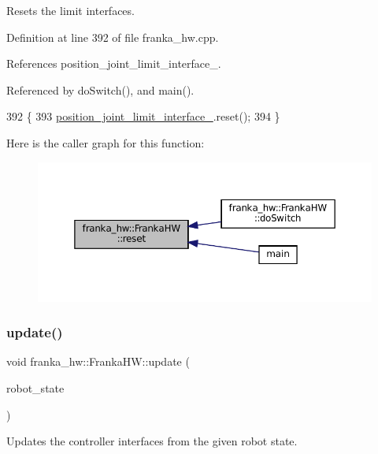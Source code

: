 Resets the limit interfaces. 

Definition at line 392 of file franka\+\_\+hw.\+cpp.



References position\+\_\+joint\+\_\+limit\+\_\+interface\+\_\+.



Referenced by do\+Switch(), and main().


\begin{DoxyCode}
392                      \{
393   \hyperlink{classfranka__hw_1_1FrankaHW_a0453d8d00992ae08ddd47083a21abcc8}{position\_joint\_limit\_interface\_}.reset();
394 \}
\end{DoxyCode}
Here is the caller graph for this function\+:
\nopagebreak
\begin{figure}[H]
\begin{center}
\leavevmode
\includegraphics[width=350pt]{classfranka__hw_1_1FrankaHW_aaa0bc020099cb6dba41728252d0c7df4_icgraph}
\end{center}
\end{figure}
\mbox{\label{classfranka__hw_1_1FrankaHW_ad8f348151b93a7eebc9ef45a702a29ee}} 
\subsubsection{\texorpdfstring{update()}{update()}}
{\footnotesize\ttfamily void franka\+\_\+hw\+::\+Franka\+H\+W\+::update (\begin{DoxyParamCaption}\item[{const \hyperlink{structfranka_1_1RobotState}{franka\+::\+Robot\+State} \&}]{robot\+\_\+state }\end{DoxyParamCaption})}

Updates the controller interfaces from the given robot state.


